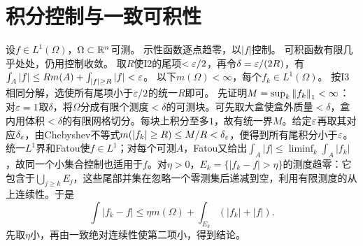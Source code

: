 \documentclass[UTF8,fontset=fandol,11pt]{ctexart}
\begin{document}
\section{积分控制与一致可积性}
设$f\in L^1(\Omega)$，$\Omega\subset\mathbb R^n$可测。
示性函数逐点趋零，以$|f|$控制。
可积函数有限几乎处处，仍用控制收敛。
取$R$使I2的尾项$<\varepsilon/2$，再令$\delta=\varepsilon/(2R)$，有$\int_A|f|\le Rm(A)+\int_{|f|\ge R}|f|<\varepsilon$。
以下$m(\Omega)<\infty$，每个$f_k\in L^1(\Omega)$。
按I3相同分解，选使所有尾项小于$\varepsilon/2$的统一$R$即可。
先证明$M=\sup_k\left\lVert f_k\right\rVert_1<\infty$：对$\varepsilon=1$取$\delta$，将$\Omega$分成有限个测度$<\delta$的可测块。可先取大盒使盒外质量$<\delta$，盒内用体积$<\delta$的有限网格切分。每块上积分至多$1$，故有统一界$M$。给定$\varepsilon$再取其对应$\delta_\varepsilon$，由Chebyshev不等式$m(|f_k|\ge R)\le M/R<\delta_\varepsilon$，便得到所有尾积分小于$\varepsilon$。
统一$L^1$界和Fatou使$f\in L^1$；对每个可测$A$，Fatou又给出$\int_A|f|\le\liminf_k\int_A|f_k|$，故同一个小集合控制也适用于$f$。对$\eta>0$，$E_k=\{|f_k-f|>\eta\}$的测度趋零：它包含于$\bigcup_{j\ge k}E_j$，这些尾部并集在忽略一个零测集后递减到空，利用有限测度的从上连续性。于是
\[\int|f_k-f|\le\eta m(\Omega)+\int_{E_k}(|f_k|+|f|).\]
先取$\eta$小，再由一致绝对连续性使第二项小，得到结论。
\originalpages
\end{document}
